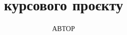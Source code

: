 \title{курсового проєкту}

\author{АВТОР}
\def\Subject{%
    ДИСЦИПЛІНА\ignorespaces
}
\def\CourseYear{%
    КУРС
}
\def\StudGroup{%
    ГРУПА
}
\def\Mentor{%
    ХТО ПЕРЕВІРИВ/КЕРІВНИК\ignorespaces
}
